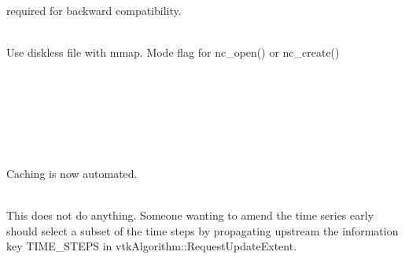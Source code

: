 \begin{DoxyRefList}
\item[{\parbox[t]{\linewidth}{Member \doxylink{netcdf_8h_aa9b57e55243b3519b8586eec528e9022}{NC\+\_\+\+LONG} }}]\hfill \\
\label{deprecated__deprecated000133}%
%
required for backward compatibility.  
\item[{\parbox[t]{\linewidth}{Member \doxylink{netcdf_8h_a1d155dff1ed760f3fc059b0cba6384d6}{NC\+\_\+\+MMAP} }}]\hfill \\
\label{deprecated__deprecated000134}%
%
Use diskless file with mmap. Mode flag for nc\+\_\+open() or nc\+\_\+create()  
\item[{\parbox[t]{\linewidth}{Member \doxylink{netcdf_8h_a8ccf2a345dba84677405678a1a00f696}{NC\+\_\+\+MPIIO} }}]\hfill \\
\label{deprecated__deprecated000136}%
%
  
\item[{\parbox[t]{\linewidth}{Member \doxylink{netcdf_8h_ab43c4edc388d148f1aad0d89c1927a7a}{NC\+\_\+\+MPIPOSIX} }}]\hfill \\
\label{deprecated__deprecated000137}%
%
  
\item[{\parbox[t]{\linewidth}{Member \doxylink{netcdf_8h_adfd6b1f072fe34d3f9c3e7217e6b9388}{NC\+\_\+\+PNETCDF} }}]\hfill \\
\label{deprecated__deprecated000138}%
%
  
\item[{\parbox[t]{\linewidth}{Member \doxylink{classvtk_particle_tracer_base_a091bcdcd262b43032a96842de211a78f}{vtk\+Particle\+Tracer\+Base::\+Set\+Disable\+Reset\+Cache} (bool)}}]\hfill \\
\label{deprecated__deprecated000153}%
%
Caching is now automated.  
\item[{\parbox[t]{\linewidth}{Member \doxylink{classvtk_particle_tracer_base_ae59dc82859e41d13f677214106a4ad64}{vtk\+Particle\+Tracer\+Base::\+VTK\+\_\+\+DEPRECATED\+\_\+\+IN\+\_\+9\+\_\+4\+\_\+0} ("{}\+Please edit the TIME\+\_\+\+STEPS information key in vtk\+Algorithm::\+\+Request\+Information() instead"{}) virtual void Set\+Termination\+Time(double)}}]\hfill \\
\label{deprecated__deprecated000152}%
%
This does not do anything. Someone wanting to amend the time series early should select a subset of the time steps by propagating upstream the information key {\ttfamily TIME\+\_\+\+STEPS} in {\ttfamily vtk\+Algorithm::\+\+Request\+Update\+Extent}.  
\item[{\parbox[t]{\linewidth}{Member \doxylink{classvtk_qt_abstract_model_adapter_a3c29db19450e12c1d51787b68424c2bd}{vtk\+Qt\+Abstract\+Model\+Adapter::\+reset} ()}}]\hfill \\
\label{deprecated__deprecated000154}%
%
 
\end{DoxyRefList}